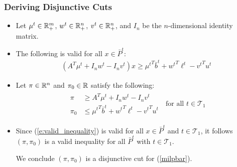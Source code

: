 \documentclass{beamer}
\begin{document}
	\begin{frame}[t]
		\frametitle{Deriving Disjunctive Cuts}
		\small
		\begin{itemize}
			\item Let $ \mu^{t} \in \mathbb{R}_+^m $, $ w^{t} \in \mathbb{R}_+^n $, $ v^{t} \in \mathbb{R}_+^n $, and $ I_n $ be the $ n $-dimensional identity matrix. 
			\item The following is valid for all $ x \in \bar{P}^{t} $:
			\begin{align}
				(A^T \mu^{t} + I_n w^{t} - I_n v^{t})x \geq {\mu^{t}}^T \bar{b}^{t} + {w^{t}}^T \ell^{t} - {v^{t}}^T u^{t} \label{e:valid_inequality}
			\end{align}
			\item Let $ \pi \in \mathbb{R}^n $ and $ \pi_0 \in \mathbb{R} $ satisfy the following:
			\begin{align}
				\begin{split}
					\pi &\geq A^T \mu^{t} + I_n w^{t} - I_n v^{t} \\
					\pi_0 & \leq {\mu^{t}}^T \bar{b}^{t} + {w^{t}}^T \ell^{t} - {v^{t}}^T u^{t}
				\end{split} \; \text{ for all } t \in \mathcal{T}_1 \label{e:disjunctive_inequality}
			\end{align}
			\item Since (\ref{e:valid_inequality}) is valid for all $ x \in \bar{P}^{t} $ and $ t \in \mathcal{T}_1 $, it follows $ (\pi, \pi_0) $ is a valid inequality for all $ \bar{P}^{t} $ with $ t \in \mathcal{T}_1 $.
			\vspace{.25cm}
			\begin{block}{}
				We conclude $ (\pi, \pi_0) $ is a disjunctive cut for (\ref{milpbar}).
			\end{block}
		\end{itemize}
		\normalsize
	\end{frame}
\end{document}
